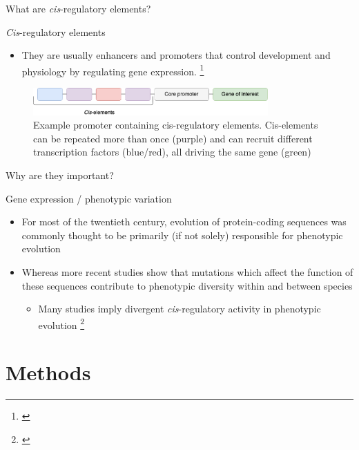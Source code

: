 \documentclass[t, aspectratio=169, allowframebreaks]{beamer}
\begin{document}
\begin{frame}[label={sec:org8ff550c}]{What are \emph{cis}-regulatory elements?}
\begin{block}{\emph{Cis}-regulatory elements}
\begin{itemize}
\item They are usually enhancers and promoters that control development and physiology by regulating gene expression. \footnote{\cite{wittkoppCisregulatoryElementsMolecular2012}}
\end{itemize}

\begin{figure}[htbp]
\centering
\includegraphics[width=9cm]{./cis-elements.png}
\caption{\label{fig:orgfe20d23}
Example promoter containing cis-regulatory elements. Cis-elements can be repeated more than once (purple) and can recruit different transcription factors (blue/red), all driving the same gene (green)}
\end{figure}
\end{block}
\end{frame}

\begin{frame}[label={sec:org92ca40e}]{Why are they important?}
\begin{block}{Gene expression / phenotypic variation}
\begin{itemize}
\item For most of the twentieth century, evolution of protein-coding sequences was commonly thought to be primarily (if not solely) responsible for phenotypic evolution
\item Whereas more recent studies show that mutations which affect the function of these sequences contribute to phenotypic diversity within and between species
\begin{itemize}
\item Many studies imply divergent \emph{cis}-regulatory activity in phenotypic evolution \footnote{\cite{carrollEvoDevoExpandingEvolutionary2008}}
\end{itemize}
\end{itemize}
\end{block}
\end{frame}

\section{Methods}
\label{sec:orgc899a07}
\end{document}
